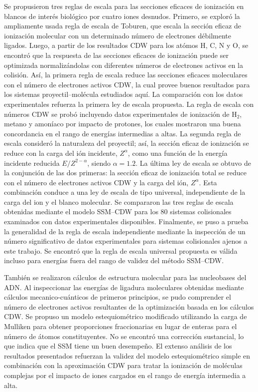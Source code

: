 Se propusieron tres reglas de escala para las secciones eficaces de 
ionización en blancos de interés biológico por cuatro iones desnudos. 
Primero, se exploró la ampliamente usada regla de escala de Toburen, que 
escala la sección eficaz de ionización molecular con un determinado 
número de electrones débilmente ligados. Luego, a partir de los 
resultados CDW para los atómos H, C, N y O, se encontró que la respuesta 
de las secciones eficaces de ionización puede ser optimizada 
normalizándolas con diferentes números de electrones activos en la 
colisión. Así, la primera regla de escala reduce las secciones eficaces 
moleculares con el número de electrones activos CDW, la cual provee 
buenos resultados para los sistemas proyectil--molécula estudiados aquí. 
La comparación con los datos experimentales refuerza la primera ley de 
escala propuesta. La regla de escala con números CDW se probó incluyendo 
datos experimentales de ionización de H$_2$, metano y amoníaco por 
impacto de protones, los cuales mostraron una buena concordancia en el 
rango de energías intermedias a altas. La segunda regla de escala 
consideró la naturaleza del proyectil; así, la sección eficaz de 
ionización se reduce con la carga del ión incidente, $Z^{\alpha}$, como 
una función de la energía incidente reducida $E/Z^{2-\alpha}$, siendo 
$\alpha=1.2$. La última ley de escala se obtuvo de la conjunción de las 
dos primeras: la sección eficaz de ionización total se reduce con el 
número de electrones activos CDW y la carga del ión, $Z^{\alpha}$. Esta 
combinación conduce a una ley de escala de tipo universal, independiente 
de la carga del ion y el blanco molecular. Se compararon las tres reglas 
de escala obtenidas mediante el modelo SSM--CDW para los 80 sistemas 
colisionales examinados con datos experimentales disponibles. 
Finalmente, se puso a prueba la generalidad de la regla de escala 
independiente mediante la inspección de un número significativo de datos 
experimentales para sistemas colisionales ajenos a este trabajo. Se 
encontró que la regla de escala universal propuesta es válida incluso 
para energías fuera del rango de validez del método SSM--CDW.

También se realizaron cálculos de estructura molecular para las 
nucleobases del ADN. Al inspeccionar las energías de ligadura 
moleculares obtenidas mediante cálculos mecanico-cuánticos de primeros 
principios, se pudo comprender el número de electrones activos 
resultantes de la optimización basada en los cálculos CDW. Se propuso un 
modelo estequiométrico modificado utilizando la carga de Mulliken para 
obtener proporciones fraccionarias en lugar de enteras para el número de 
átomos constituyentes. No se encontró una corrección sustancial, lo que 
indica que el SSM tiene un buen desempeño. El extenso análisis de los 
resultados presentados refuerzan la validez del modelo estequiométrico 
simple en combinación con la aproximación CDW para tratar la ionización 
de moléculas complejas por el impacto de iones cargados en el rango de 
energía intermedia a alta. 



